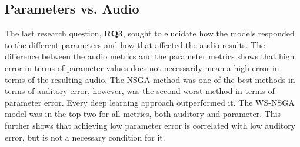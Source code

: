  



\subsection{Parameters vs. Audio}
The last research question, \textbf{RQ3}, sought to elucidate how the models responded to the different parameters and how that affected the audio results. The difference between the audio metrics and the parameter metrics shows that high error in terms of parameter values does not necessarily mean a high error in terms of the resulting audio. The NSGA method was one of the best methods in terms of auditory error, however, was the second worst method in terms of parameter error. Every deep learning approach outperformed it. The WS-NSGA model was in the top two for all metrics, both auditory and parameter. This further shows that achieving low parameter error is correlated with low auditory error, but is not a necessary condition for it.

